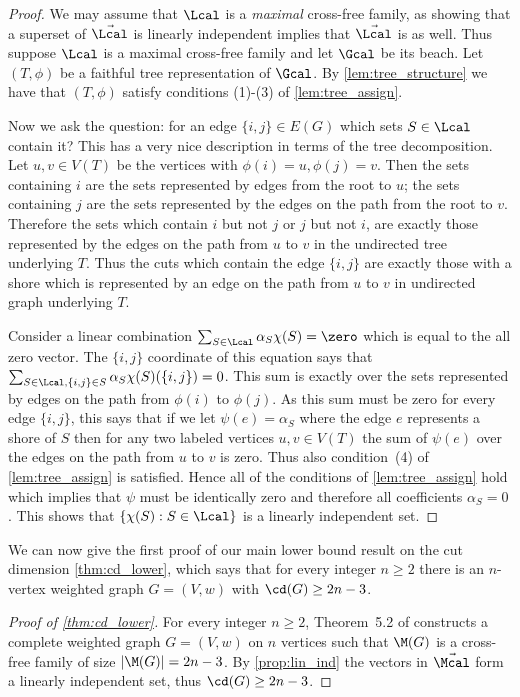 \begin{proof}
We may assume that $\Lcal$ is a \emph{maximal} cross-free family, as showing that a superset of $\vec{\Lcal}$ is linearly independent
implies that $\vec{\Lcal}$ is as well.  Thus suppose $\Lcal$ is a maximal cross-free family and let $\Gcal$ be its beach.  Let $(T,\phi)$ be a faithful tree representation of
$\Gcal$.  By \cref{lem:tree_structure} we have that $(T,\phi)$ satisfy conditions (1)-(3) of \cref{lem:tree_assign}.

Now we ask the question: for an edge $\{i,j\} \in E(G)$ which sets $S \in \Lcal$ contain it?
This has a very nice description in terms of the tree decomposition.  Let $u,v \in V(T)$ be the vertices with
$\phi(i) = u, \phi(j) = v$.  Then the sets containing $i$ are the sets represented by edges from the root to $u$;  the sets containing
$j$ are the sets represented by the edges on the path from the root to $v$.  Therefore the sets which contain $i$ but not $j$ or $j$ but
not $i$, are exactly those represented by the edges on the path from $u$ to $v$ in the undirected tree underlying $T$.  Thus the cuts which
contain the edge $\{i,j\}$ are exactly those with a shore which is represented by an edge on the path from $u$ to $v$ in undirected graph underlying $T$.

Consider a linear combination $\sum_{S \in \Lcal} \alpha_S \chi(S) = \zero$ which is equal to the all zero vector.  The $\{i,j\}$ coordinate
of this equation says that $\sum_{S \in \Lcal, \{i,j\} \in S} \alpha_S \chi(S)(\{i,j\}) = 0$.  This sum is exactly over the sets represented by edges
on the path from $\phi(i)$ to $\phi(j)$.  As this sum must be zero for every edge $\{i,j\}$, this says that if we let $\psi(e) = \alpha_S$ where the edge $e$
represents a shore of $S$ then for any two labeled vertices $u,v \in V(T)$ the sum of $\psi(e)$ over the edges on the path from $u$ to $v$ is zero.
Thus also condition~(4) of \cref{lem:tree_assign} is satisfied.
Hence all of the conditions of \cref{lem:tree_assign} hold which implies that
$\psi$ must be identically zero and therefore all coefficients $\alpha_S = 0$.  This shows that $\{\chi(S): S \in \Lcal\}$ is a linearly independent set.
\end{proof}

We can now give the first proof of our main lower bound result on the cut dimension \cref{thm:cd_lower}, which
says that for every integer $n\ge 2$ there is an $n$-vertex weighted graph $G = (V,w)$ with $\cd(G) \ge 2n-3$.

\begin{proof}[Proof of \cref{thm:cd_lower}]
For every integer $n \ge 2$, Theorem~5.2 of \cite{CR04} constructs a complete weighted graph $G = (V,w)$ on $n$ vertices such that
$\M(G)$ is a cross-free family of size $|\M(G)| = 2n-3$.  By \cref{prop:lin_ind} the vectors in $\vec{\Mcal}$ form a linearly
independent set, thus $\cd(G) \ge 2n-3$.
\end{proof}

